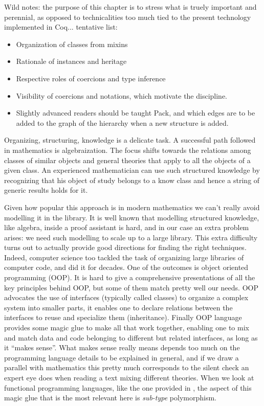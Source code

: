Wild notes: the purpose of this chapter is to stress what is truely
important and perennial, as opposed to technicalities too much tied to
the present technology implemented in Coq... tentative list:
\begin{itemize}
\item Organization of classes from mixins
\item Rationale of instances and heritage
\item Respective roles of coercions and type inference
\item Visibility of coercions and notations, which motivate the
   discipline.
\item Slightly advanced readers should be taught Pack, and which edges
  are to be added to the graph of the hierarchy when a new
  structure is added.
\end{itemize}


Organizing, structuring, knowledge is a delicate task. A successful
path followed in mathematics is algebraization. The focus shifts
towards the relations among classes of similar objects and general
theories that apply to all the objects of a given class.
An experienced mathematician can use such structured
knowledge by recognizing that his object of study belongs to a know
class and hence a string of generic results holds for it.

Given how popular this approach is in modern mathematics we can't
really avoid modelling it in the \mcbMC{} library.  It is well known that
modelling structured knowledge, like algebra, inside a proof assistant
is hard, and in our case an extra problem arises: we need such
modelling to scale up to a large library. This extra difficulty turns
out to actually provide good directions for finding the right
techniques.  Indeed, computer science too tackled the task of
organizing large libraries of computer code, and did it for decades.
One of the outcomes is object oriented programming (OOP).
It is hard to give a comprehensive presentations of all the key
principles behind OOP, but some of them match pretty well our needs.
OOP advocates the use of interfaces (typically called classes) to
organize a complex system into smaller parts, it enables one
to declare relations between the interfaces to reuse and
specialize them (inheritance).  Finally OOP language provides some
magic glue to make all that work together, enabling one to mix and
match data and code belonging to different but related interfaces, as
long as it ``makes sense''.  What makes sense really means depends too
much on the programming language details to be explained in general,
and if we draw a parallel with mathematics this pretty much
corresponds to the silent check an expert eye does when reading a text
mixing different theories.
When we look at functional programming languages, like the one
provided in \mcbCIC{}, the aspect of this magic glue that is the most
relevant here is \emph{sub-type} polymorphism.

